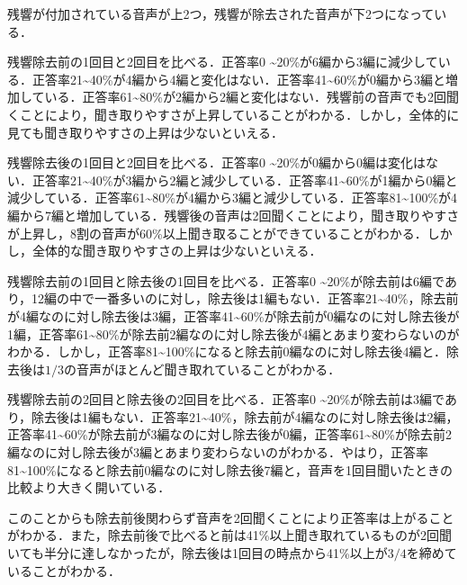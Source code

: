 \documentclass[a4j,11pt]{jsarticle}
\begin{document}
残響が付加されている音声が上2つ，残響が除去された音声が下2つになっている．

残響除去前の1回目と2回目を比べる．正答率0	\textasciitilde20\%が6編から3編に減少している．正答率21\textasciitilde40\%が4編から4編と変化はない．正答率41\textasciitilde60\%が0編から3編と増加している．正答率61\textasciitilde80\%が2編から2編と変化はない．残響前の音声でも2回聞くことにより，聞き取りやすさが上昇していることがわかる．しかし，全体的に見ても聞き取りやすさの上昇は少ないといえる．

残響除去後の1回目と2回目を比べる．正答率0	\textasciitilde20\%が0編から0編は変化はない．正答率21\textasciitilde40\%が3編から2編と減少している．正答率41\textasciitilde60\%が1編から0編と減少している．正答率61\textasciitilde80\%が4編から3編と減少している．正答率81\textasciitilde100\%が4編から7編と増加している．残響後の音声は2回聞くことにより，聞き取りやすさが上昇し，8割の音声が60\%以上聞き取ることができていることがわかる．しかし，全体的な聞き取りやすさの上昇は少ないといえる．

残響除去前の1回目と除去後の1回目を比べる．正答率0	\textasciitilde20\%が除去前は6編であり，12編の中で一番多いのに対し，除去後は1編もない．正答率21\textasciitilde40\%，除去前が4編なのに対し除去後は3編，正答率41\textasciitilde60\%が除去前が0編なのに対し除去後が1編，正答率61\textasciitilde80\%が除去前2編なのに対し除去後が4編とあまり変わらないのがわかる．しかし，正答率81\textasciitilde100\%になると除去前0編なのに対し除去後4編と．除去後は$1/3$の音声がほとんど聞き取れていることがわかる．

残響除去前の2回目と除去後の2回目を比べる．正答率0	\textasciitilde20\%が除去前は3編であり，除去後は1編もない．正答率21\textasciitilde40\%，除去前が4編なのに対し除去後は2編，正答率41\textasciitilde60\%が除去前が3編なのに対し除去後が0編，正答率61\textasciitilde80\%が除去前2編なのに対し除去後が3編とあまり変わらないのがわかる．やはり，正答率81\textasciitilde100\%になると除去前0編なのに対し除去後7編と，音声を1回目聞いたときの比較より大きく開いている．

このことからも除去前後関わらず音声を2回聞くことにより正答率は上がることがわかる．また，除去前後で比べると前は41\%以上聞き取れているものが2回聞いても半分に達しなかったが，除去後は1回目の時点から41\%以上が$3/4$を締めていることがわかる．

\end{document}
